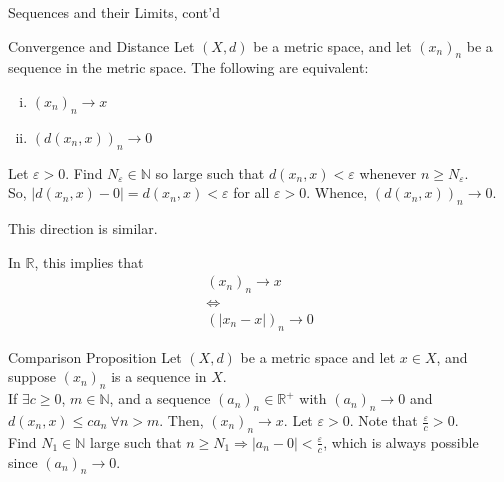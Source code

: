 \documentclass[10pt]{extarticle}
\newcommand{\N}{\mathbb{N}}
\newcommand{\R}{\mathbb{R}}
\begin{document}
  \begin{problem}{Sequences and their Limits, cont'd}
    \begin{problem}{Convergence and Distance}
      Let $(X,d)$ be a metric space, and let $(x_n)_n$ be a sequence in the metric space. The following are equivalent:
      \begin{enumerate}[(i)]
        \item $(x_n)_n\rightarrow x$
        \item $\left(d(x_n,x)\right)_n \rightarrow 0$
      \end{enumerate}
      \tcblower
      \begin{description}[font=\normalfont]
        \item[(i) $\Rightarrow$ (b)] Let $\varepsilon > 0$. Find $N_{\varepsilon}\in\N$ so large such that $d(x_n,x) < \varepsilon$ whenever $n \geq N_{\varepsilon}$.\\

          So, $|d(x_n,x)-0| = d(x_n,x) < \varepsilon$ for all $\varepsilon > 0$. Whence, $\left(d(x_n,x)\right)_n \rightarrow 0$.
        \item[(ii) $\Rightarrow$ (i)] This direction is similar.
      \end{description}
    \end{problem}
    In $\R$, this implies that
    \begin{align*}
      (x_n)_n \rightarrow x\\
      \Leftrightarrow\\
      (|x_n -x|)_n \rightarrow 0
    \end{align*}
    \begin{problem}{Comparison Proposition}
      Let $(X,d)$ be a metric space and let $x\in X$, and suppose $(x_n)_n$ is a sequence in $X$.\\

      If $\exists c\geq 0$, $m\in\N$, and a sequence $(a_n)_n\in\R^+$ with $(a_n)_n \rightarrow 0$ and $d(x_n,x) \leq c a_n~\forall n > m$. Then, $(x_n)_n\rightarrow x$.
      \tcblower
      Let $\varepsilon > 0$. Note that $\frac{\varepsilon}{c} > 0$.\\

      Find $N_1\in \N$ large such that $n \geq N_1 \Rightarrow |a_n - 0| < \frac{\varepsilon}{c}$, which is always possible since $(a_n)_n \rightarrow 0$.\\


\end{problem}
\end{problem}
\end{document}

